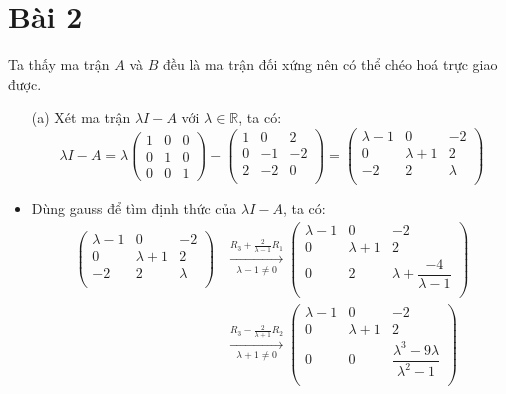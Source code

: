 \documentclass[a4paper, 12pt]{report}
\begin{document}
\section{Bài 2}
Ta thấy ma trận $A$ và $B$ đều là ma trận đối xứng nên có thể chéo hoá trực giao được.
\begin{itemize}
    \item[(a)] Xét ma trận $\lambda I - A$ với $\lambda \in \mathbb{R}$, ta có:
    $$
    \lambda I - A = 
    \lambda \begin{pmatrix}
    1 & 0 & 0 \\     
    0 & 1 & 0 \\
    0 & 0 & 1
    \end{pmatrix}
    -
    \begin{pmatrix}
        1 & 0 & 2 \\
        0 & -1 & -2 \\
        2 & -2 & 0 \\
    \end{pmatrix}
    =
    \begin{pmatrix}
       \lambda - 1 & 0 & -2 \\ 
       0 & \lambda + 1 & 2 \\
       -2 & 2 & \lambda \\
    \end{pmatrix}
    $$

    \item Dùng gauss để tìm định thức của $\lambda I - A$, ta có:
    $$
    \begin{aligned}
    \begin{pmatrix}
       \lambda - 1 & 0 & -2 \\ 
       0 & \lambda + 1 & 2 \\
       -2 & 2 & \lambda \\
    \end{pmatrix}
    &\xrightarrow[\lambda - 1 \neq 0]{R_3 + \frac{2}{\lambda - 1}R_1}
    \begin{pmatrix}
       \lambda - 1 & 0 & -2 \\ 
       0 & \lambda + 1 & 2 \\
       0 & 2 & \lambda + \dfrac{-4}{\lambda - 1} \\
    \end{pmatrix} \\
    &\xrightarrow[\lambda + 1 \neq 0]{R_3 - \frac{2}{\lambda + 1}R_2}
    \begin{pmatrix}
       \lambda - 1 & 0 & -2 \\ 
       0 & \lambda + 1 & 2 \\
       0 & 0 & \dfrac{\lambda^3 - 9\lambda}{\lambda^2 - 1} \\
    \end{pmatrix}
    \end{aligned}
    $$


\end{itemize}
\end{document}
